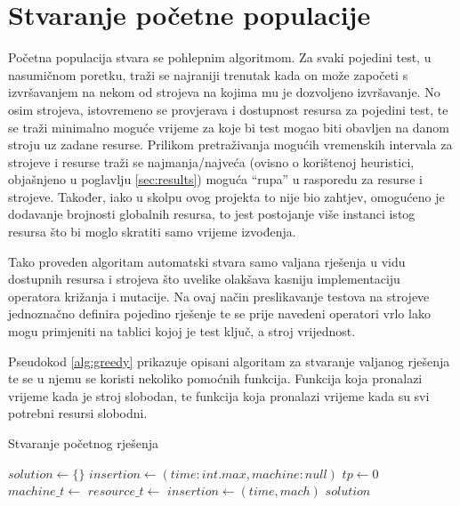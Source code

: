 \documentclass[utf8, seminar, numeric]{fer}
\begin{document}
\section{Stvaranje početne populacije} 

Početna populacija stvara se pohlepnim algoritmom. Za svaki pojedini test, u nasumičnom poretku, traži se najraniji trenutak kada on može započeti s izvršavanjem na nekom od strojeva na kojima mu je dozvoljeno izvršavanje. No osim strojeva, istovremeno se provjerava i dostupnost resursa za pojedini test, te se traži minimalno moguće vrijeme za koje bi test mogao biti obavljen na danom stroju uz zadane resurse. Prilikom pretraživanja mogućih vremenskih intervala za strojeve i resurse traži se najmanja/najveća (ovisno o korištenoj heuristici, objašnjeno u poglavlju \ref{sec:results}) moguća ``rupa'' u rasporedu za resurse i strojeve. Također, iako u skolpu ovog projekta to nije bio zahtjev, omogućeno je dodavanje brojnosti globalnih resursa, to jest postojanje više instanci istog resursa što bi moglo skratiti samo vrijeme izvođenja.

Tako proveden algoritam automatski stvara samo valjana  rješenja u vidu dostupnih resursa i strojeva što uvelike olakšava kasniju implementaciju operatora križanja i mutacije. Na ovaj način preslikavanje testova na strojeve jednoznačno definira pojedino rješenje te se prije navedeni operatori vrlo lako mogu primjeniti na tablici kojoj je test ključ, a stroj vrijednost.

Pseudokod \ref{alg:greedy} prikazuje opisani algoritam za stvaranje valjanog rješenja te se u njemu se koristi nekoliko pomoćnih funkcija. Funkcija  koja pronalazi vrijeme kada je stroj slobodan, te funkcija  koja pronalazi vrijeme kada su svi potrebni resursi slobodni.

\begin{algorithm}[H]
	\caption{Stvaranje početnog rješenja}
	\begin{algorithmic}[1]
				\State $solution \gets \{\}$
				    \State $insertion \gets (time: int.max, machine: null)$
				        \State $tp \gets 0$ 
				            \State $machine\_t \gets$ 
				            \State $resource\_t \gets$ 
				                    \State $insertion \gets (time, mach)$
				                \EndIf
				            \EndIf
				        \EndWhile
				    \EndFor
				    \State {}
				\EndFor
			\State \Return $solution$
		\EndFunction
	\end{algorithmic}
	\label{alg:greedy}
\end{algorithm}
\end{document}
